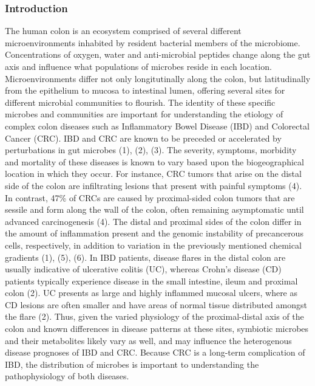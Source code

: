 \documentclass[11pt,]{article}
\begin{document}
\subsubsection{Introduction}\label{introduction}

The human colon is an ecosystem comprised of several different
microenvironments inhabited by resident bacterial members of the
microbiome. Concentrations of oxygen, water and anti-microbial peptides
change along the gut axis and influence what populations of microbes
reside in each location. Microenvironments differ not only
longitutinally along the colon, but latitudinally from the epithelium to
mucosa to intestinal lumen, offering several sites for different
microbial communities to flourish. The identity of these specific
microbes and communities are important for understanding the etiology of
complex colon diseases such as Inflammatory Bowel Disease (IBD) and
Colorectal Cancer (CRC). IBD and CRC are known to be preceded or
accelerated by perturbations in gut microbes (1), (2), (3). The
severity, symptoms, morbidity and mortality of these diseases is known
to vary based upon the biogeographical location in which they occur. For
instance, CRC tumors that arise on the distal side of the colon are
infiltrating lesions that present with painful symptoms (4). In
contrast, 47\% of CRCs are caused by proximal-sided colon tumors that
are sessile and form along the wall of the colon, often remaining
asymptomatic until advanced carcinogenesis (4). The distal and proximal
sides of the colon differ in the amount of inflammation present and the
genomic instability of precancerous cells, respectively, in addition to
variation in the previously mentioned chemical gradients (1), (5), (6).
In IBD patients, disease flares in the distal colon are usually
indicative of ulcerative colitis (UC), whereas Crohn's disease (CD)
patients typically experience disease in the small intestine, ileum and
proximal colon (2). UC presents as large and highly inflammed mucosal
ulcers, where as CD lesions are often smaller and have areas of normal
tissue distributed amongst the flare (2). Thus, given the varied
physiology of the proximal-distal axis of the colon and known
differences in disease patterns at these sites, symbiotic microbes and
their metabolites likely vary as well, and may influence the
heterogenous disease prognoses of IBD and CRC. Because CRC is a
long-term complication of IBD, the distribution of microbes is important
to understanding the pathophysiology of both diseases.
\end{document}
